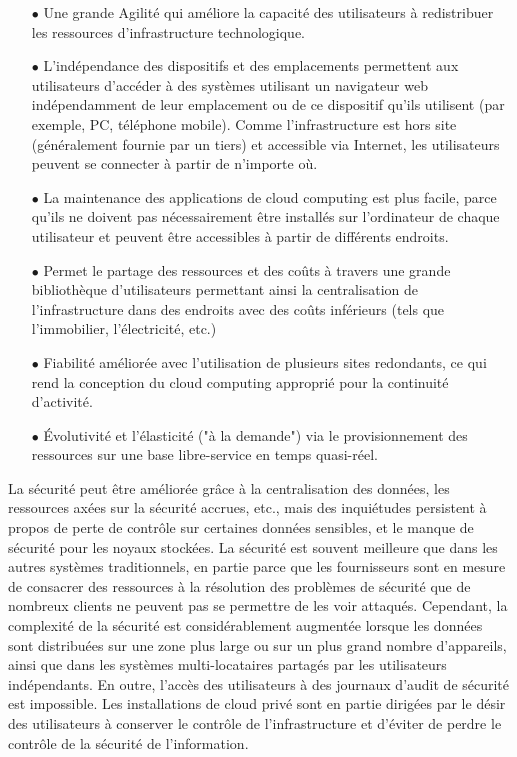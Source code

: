             \begin{itemize}
                \item[\quad $\bullet$]Une grande Agilité qui améliore la capacité des utilisateurs à redistribuer les ressources d'infrastructure technologique.\\
                \item[\quad $\bullet$]L'indépendance des dispositifs et des emplacements  permettent aux utilisateurs d'accéder à des systèmes utilisant un navigateur web indépendamment de leur emplacement ou de ce dispositif qu'ils utilisent (par exemple, PC, téléphone mobile). Comme l'infrastructure est hors site (généralement fournie par un tiers) et accessible via Internet, les utilisateurs peuvent se connecter à partir de n'importe où.
                \item[\quad $\bullet$]La maintenance des applications de cloud computing est plus facile, parce qu'ils ne doivent pas nécessairement être installés sur l'ordinateur de chaque utilisateur et peuvent être accessibles à partir de différents endroits.
                \item[\quad $\bullet$]Permet le partage des ressources et des coûts à travers une grande bibliothèque d'utilisateurs permettant ainsi la centralisation de l'infrastructure dans des endroits avec des coûts inférieurs (tels que l'immobilier, l'électricité, etc.)
                \item[\quad $\bullet$]Fiabilité améliorée avec l'utilisation de plusieurs sites redondants, ce qui rend la conception du cloud computing approprié pour la continuité d'activité.
                \item[\quad $\bullet$]Évolutivité et l'élasticité ("à la demande") via le provisionnement des ressources sur une base libre-service  en temps quasi-réel.
            \end{itemize}
            La sécurité peut être améliorée grâce à la centralisation des données, les ressources axées sur la sécurité accrues, etc., mais des inquiétudes persistent à propos de  perte de contrôle sur certaines données sensibles, et le manque de sécurité pour les noyaux stockées. La sécurité est souvent  meilleure que dans les autres systèmes traditionnels, en partie parce que les fournisseurs sont en mesure de consacrer des ressources à la résolution des problèmes de sécurité que de nombreux clients ne peuvent pas se permettre de les voir attaqués.  Cependant, la complexité de la sécurité est considérablement augmentée lorsque les données sont distribuées sur une zone plus large ou sur un plus grand nombre d'appareils, ainsi que dans les systèmes multi-locataires partagés par les utilisateurs indépendants. En outre, l'accès des utilisateurs à des journaux d'audit de sécurité est impossible. Les installations de cloud privé sont en partie dirigées par le désir des utilisateurs à conserver le contrôle de l'infrastructure et d'éviter de perdre le contrôle de la sécurité de l'information.
